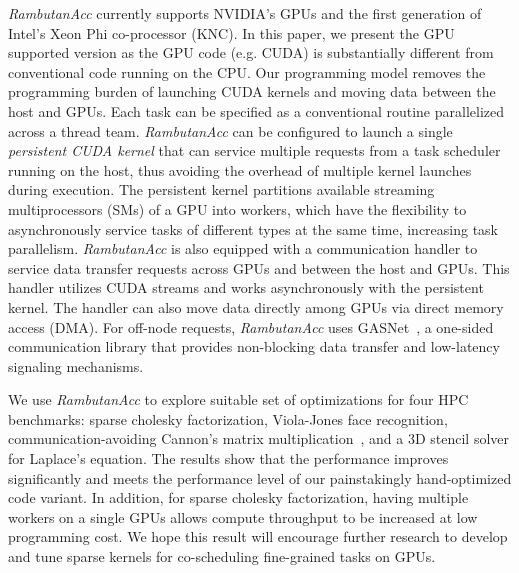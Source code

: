 {\em RambutanAcc} currently supports NVIDIA's GPUs and the first generation of Intel's Xeon Phi co-processor (KNC).
In this paper, we present the GPU supported version as the GPU code (e.g. CUDA) is substantially different from conventional code running on the CPU.
Our programming model removes the programming burden of launching CUDA kernels and moving data between the host and GPUs.
Each task can be specified as a conventional routine parallelized across a thread team.
{\em RambutanAcc} can be configured to launch a single {\em persistent CUDA kernel} that can service multiple requests from a task scheduler running on the host, thus avoiding the overhead of multiple kernel launches during execution.
The persistent kernel partitions available streaming multiprocessors (SMs) of a GPU into workers, which have the flexibility to asynchronously service tasks of different types at the same time, increasing task parallelism.
{\em RambutanAcc} is also equipped with a communication handler to service data transfer requests across GPUs and between the host and GPUs.
This handler utilizes CUDA streams and works asynchronously with the persistent kernel.
The handler can also move data directly among GPUs via direct memory access (DMA).
For off-node requests, {\em RambutanAcc} uses GASNet~\cite{Bonachea:2002:gasnet}, a one-sided communication library %
that provides non-blocking data transfer and low-latency signaling mechanisms. %

We use {\em RambutanAcc} to explore suitable set of optimizations for four HPC benchmarks: sparse cholesky factorization, Viola-Jones face recognition, communication-avoiding Cannon's matrix multiplication~\cite{25Dcannon}, and a 3D stencil solver for Laplace's equation.
The results show that the performance improves significantly and meets the performance level of our painstakingly hand-optimized code variant.
In addition, for sparse cholesky factorization, having multiple workers on a single GPUs allows compute throughput to be increased at low programming cost. 
We hope this result will encourage further research to develop and tune sparse kernels for co-scheduling fine-grained tasks on GPUs.

